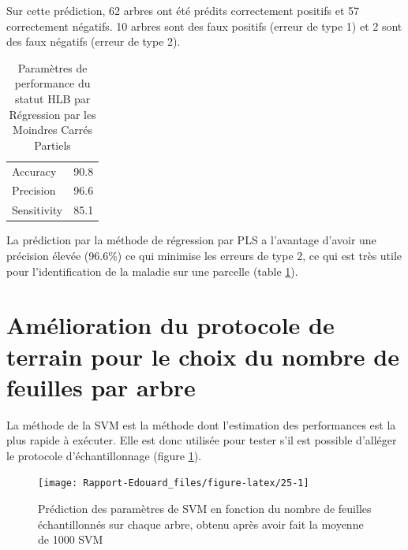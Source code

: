 \documentclass[
  11pt,
  french,
  a4paper,
  extrafontsizes,onecolumn,openright
  ]{memoir}
\begin{document}
\normalsize

Sur cette prédiction, 62 arbres ont été prédits correctement positifs et 57 correctement négatifs. 10 arbres sont des faux positifs (erreur de type 1) et 2 sont des faux négatifs (erreur de type 2).

\scriptsize

\begin{longtable}[t]{lr}
\caption{\label{tab:T4}Paramètres de performance du statut HLB par Régression par les Moindres Carrés Partiels}\\
\toprule
Accuracy & 90.8\\
Precision & 96.6\\
Sensitivity & 85.1\\
\bottomrule
\end{longtable}

\normalsize

La prédiction par la méthode de régression par PLS a l'avantage d'avoir une précision élevée (96.6\%) ce qui minimise les erreurs de type 2, ce qui est très utile pour l'identification de la maladie sur une parcelle (table \ref{tab:T4}).

\vfill
\newpage

\hypertarget{amuxe9lioration-du-protocole-de-terrain-pour-le-choix-du-nombre-de-feuilles-par-arbre}{%
\section{Amélioration du protocole de terrain pour le choix du nombre de feuilles par arbre}\label{amuxe9lioration-du-protocole-de-terrain-pour-le-choix-du-nombre-de-feuilles-par-arbre}}

La méthode de la SVM est la méthode dont l'estimation des performances est la plus rapide à exécuter. Elle est donc utilisée pour tester s'il est possible d'alléger le protocole d'échantillonnage (figure \ref{fig:25}).

\scriptsize

\begin{figure}

{\centering \texttt{[image: Rapport-Edouard\_files/figure-latex/25-1]} 

}

\caption{Prédiction des paramètres de SVM en fonction du nombre de feuilles échantillonnés sur chaque arbre, obtenu après avoir fait la moyenne de 1000 SVM}\label{fig:25}
\end{figure}

\normalsize
\end{document}
